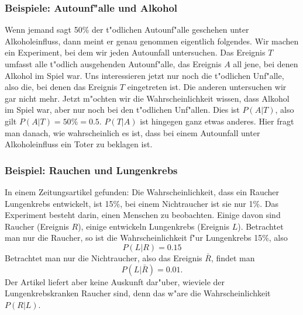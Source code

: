 \subsubsection{Beispiele: Autounf"alle und Alkohol}
Wenn jemand sagt 50\%
der t"odlichen Autounf"alle geschehen unter Alkoholeinfluss, dann
meint er genau genommen eigentlich folgendes. Wir machen ein Experiment,
bei dem wir jeden Autounfall untersuchen. Das Ereignis $T$ umfasst alle
t"odlich ausgehenden Autounf"alle, das Ereignis $A$ all jene, bei denen
Alkohol im Spiel war. Uns interessieren jetzt nur noch die t"odlichen
Unf"alle, also die, bei denen das Ereignis $T$ eingetreten ist. 
Die anderen untersuchen wir gar nicht mehr. Jetzt m"ochten wir die
Wahrscheinlichkeit wissen, dass Alkohol im Spiel war, aber nur noch
bei den t"odlichen Unf"allen. Dies ist $P(A|T)$, also gilt
$P(A|T)=50\% = 0.5$.
$P(T|A)$ ist hingegen ganz etwas anderes. Hier fragt man danach,
wie wahrscheinlich es ist, dass bei einem Autounfall unter Alkoholeinfluss
ein Toter zu beklagen ist.

\subsubsection{Beispiel: Rauchen und Lungenkrebs}
In einem Zeitungsartikel gefunden: Die Wahrscheinlichkeit, dass ein Raucher
Lungenkrebs entwickelt, ist 15\%, bei einem Nichtraucher ist sie nur 1\%.
Das Experiment besteht darin, einen Menschen zu beobachten. Einige
davon sind Raucher (Ereignis $R$), einige entwickeln Lungenkrebs (Ereignis $L$).
Betrachtet man nur die Raucher, so ist die Wahrscheinlichkeit f"ur
Lungenkrebs 15\%, also
\[
P(L|R)=0.15
\]
Betrachtet man nur die Nichtraucher, also das Ereignis $\bar R$, findet
man 
\[
P(L|\bar R)=0.01.
\]
Der Artikel liefert aber keine Auskunft dar"uber, wieviele der
Lungenkrebskranken Raucher sind, denn das w"are die Wahrscheinlichkeit
$P(R|L)$.

